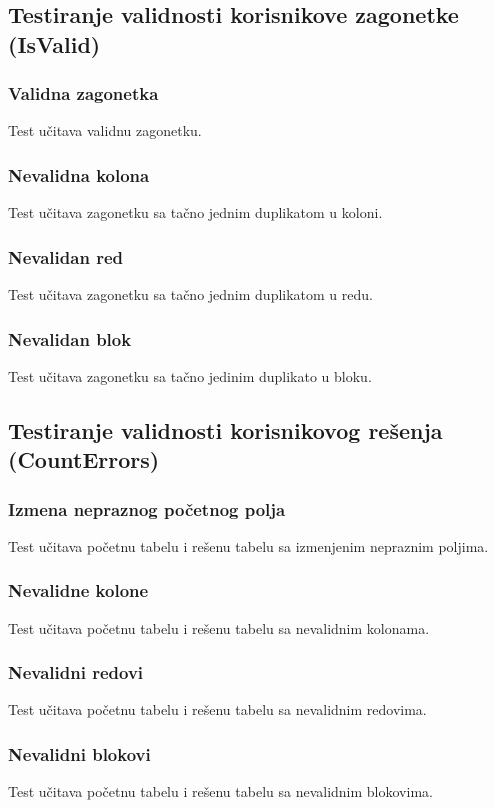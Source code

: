 \documentclass[a4paper]{article}
\begin{document}
    \subsection{Testiranje validnosti korisnikove zagonetke (IsValid)}
    \subsubsection{Validna zagonetka}
    Test učitava validnu zagonetku.
    \subsubsection{Nevalidna kolona}
    Test učitava zagonetku sa tačno jednim duplikatom u koloni. 
    \subsubsection{Nevalidan red}
    Test učitava zagonetku sa tačno jednim duplikatom u redu.
    \subsubsection{Nevalidan blok}
    Test učitava zagonetku sa tačno jedinim duplikato u bloku.

    \subsection{Testiranje validnosti korisnikovog rešenja (CountErrors)}
    \subsubsection{Izmena nepraznog početnog polja}
    Test učitava početnu tabelu i rešenu tabelu sa izmenjenim nepraznim poljima. 
    \subsubsection{Nevalidne kolone}
    Test učitava početnu tabelu i rešenu tabelu sa nevalidnim kolonama. 
    \subsubsection{Nevalidni redovi}
    Test učitava početnu tabelu i rešenu tabelu sa nevalidnim redovima.
    \subsubsection{Nevalidni blokovi}
    Test učitava početnu tabelu i rešenu tabelu sa nevalidnim blokovima.
\end{document}
